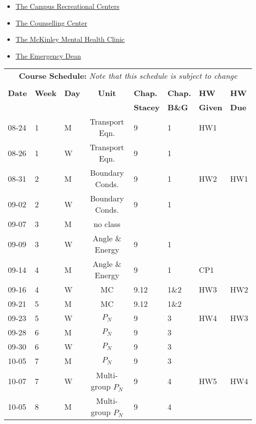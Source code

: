 \documentclass[11pt, a4paper]{article}
\begin{document}
\begin{itemize}
\item \href{https://campusrec.illinois.edu/}{The Campus Recreational Centers}
\item \href{http://counselingcenter.illinois.edu/}{The Counselling Center}
\item \href{http://www.mckinley.illinois.edu/clinics/mental\_health.htm}{The McKinley Mental Health Clinic}
\item \href{http://odos.illinois.edu/emergency/}{The Emergency Dean}
\end{itemize}

\pagebreak
\FloatBarrier
\renewcommand{\arraystretch}{1}
\begin{table}[h]
\begin{center}
\begin{tabular}{lllcllll}
\multicolumn{8}{c}{\textbf{Course Schedule:}\textit{ Note that this schedule is subject to change}}\\
&&&&&&&\\
\textbf{Date} & \textbf{Week} & \textbf{Day} & \textbf{Unit} & \textbf{Chap.} & \textbf{Chap.} & \textbf{HW} & \textbf{HW}\\
              &  &  & & \textbf{Stacey}& \textbf{B\&G} & \textbf{Given} & \textbf{Due}\\
\hline
\hline
08-24 & 1 & M & Transport Eqn. & 9 & 1 & HW1 & \\
08-26 & 1 & W & Transport Eqn. & 9 & 1 &  & \\
08-31 & 2 & M & Boundary Conds. & 9 & 1 & HW2 & HW1\\
09-02 & 2 & W & Boundary Conds. & 9 & 1 &  & \\
09-07 & 3 & M & no class &  &  &  & \\
09-09 & 3 & W & Angle \& Energy & 9 & 1 &  & \\
09-14 & 4 & M & Angle \& Energy & 9 & 1 & CP1 & \\
09-16 & 4 & W & MC    & 9.12 & 1\&2 &  HW3 & HW2\\
09-21 & 5 & M & MC & 9.12 & 1\&2 &  & \\
09-23 & 5 & W & $P_N$ & 9 & 3 & HW4 & HW3\\
09-28 & 6 & M & $P_N$ & 9 & 3 &  & \\
09-30 & 6 & W & $P_N$ & 9 & 3 &  & \\
10-05 & 7 & M & $P_N$ & 9 & 3 &  & \\
10-07 & 7 & W & Multi-group $P_N$ & 9 & 4 & HW5  & HW4\\
10-05 & 8 & M & Multi-group $P_N$ & 9 & 4 &  & \\

\end{tabular}
\end{center}
\end{table}
\end{document}
